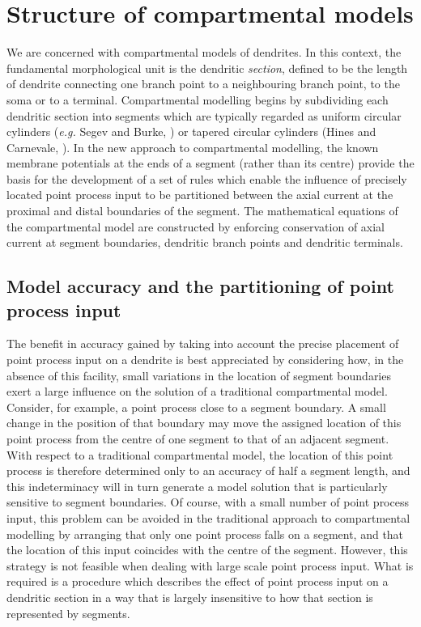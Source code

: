 \section{Structure of compartmental models}

We are concerned with compartmental models of dendrites. In this
context, the fundamental morphological unit is the dendritic
\emph{section}, defined to be the length of dendrite connecting
one branch point to a neighbouring branch point, to the soma or to
a terminal. Compartmental modelling begins by subdividing each
dendritic section into segments which are typically regarded as
uniform circular cylinders (\emph{e.g.} Segev and Burke,
\cite{Segev98}) or tapered circular cylinders (Hines and
Carnevale, \cite{Hines97}). In the new approach to compartmental
modelling, the known membrane potentials at the ends of a segment
(rather than its centre) provide the basis for the development of
a set of rules which enable the influence of precisely located
point process input to be partitioned between the axial current at
the proximal and distal boundaries of the segment. The
mathematical equations of the compartmental model are constructed
by enforcing conservation of axial current at segment boundaries,
dendritic branch points and dendritic terminals.

\subsection{Model accuracy and the partitioning of point process input}\label{assertion}

The benefit in accuracy gained by taking into account the precise
placement of point process input on a dendrite is best appreciated
by considering how, in the absence of this facility, small
variations in the location of segment boundaries exert a large
influence on the solution of a traditional compartmental model.
Consider, for example, a point process close to a segment
boundary. A small change in the position of that boundary may move
the assigned location of this point process from the centre of one
segment to that of an adjacent segment. With respect to a
traditional compartmental model, the location of this point
process is therefore determined only to an accuracy of half a
segment length, and this indeterminacy will in turn generate a
model solution that is particularly sensitive to segment
boundaries. Of course, with a small number of point process input,
this problem can be avoided in the traditional approach to
compartmental modelling by arranging that only one point process
falls on a segment, and that the location of this input coincides
with the centre of the segment. However, this strategy is not
feasible when dealing with large scale point process input. What
is required is a procedure which describes the effect of point
process input on a dendritic section in a way that is largely
insensitive to how that section is represented by segments.

